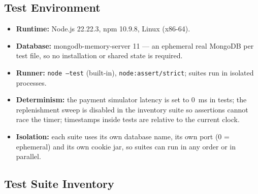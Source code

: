 \documentclass[11pt,a4paper]{article}
\begin{document}
\subsection{Test Environment}
\begin{itemize}[leftmargin=1.2em,itemsep=1pt,topsep=2pt]
  \item \textbf{Runtime:} Node.js 22.22.3, npm 10.9.8, Linux (x86-64).
  \item \textbf{Database:} mongodb-memory-server 11 --- an ephemeral real MongoDB per test file, so no installation or shared state is required.
  \item \textbf{Runner:} \texttt{node --test} (built-in), \texttt{node:assert/strict}; suites run in isolated processes.
  \item \textbf{Determinism:} the payment simulator latency is set to 0~ms in tests; the replenishment sweep is disabled in the inventory suite so assertions cannot race the timer; timestamps inside tests are relative to the current clock.
  \item \textbf{Isolation:} each suite uses its own database name, its own port (0 = ephemeral) and its own cookie jar, so suites can run in any order or in parallel.
\end{itemize}

\subsection{Test Suite Inventory}
\end{document}
